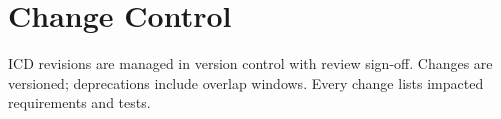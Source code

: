 
\section{Change Control}
ICD revisions are managed in version control with review sign-off. Changes are versioned; deprecations include overlap windows. Every change lists impacted requirements and tests.
